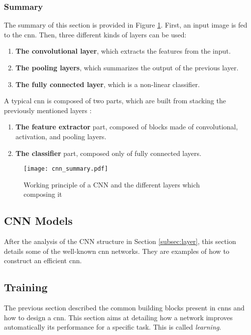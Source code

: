 \subsubsection{Summary}
%
The summary of this section is provided in Figure \ref{fig:layer:summary}. First, an input image is fed to the \acrshort{cnn}. Then, three different kinds of layers can be used:
%
\begin{enumerate}
    \item \textbf{The convolutional layer}, which extracts the features from the input.
    \item \textbf{The pooling layers}, which summarizes the output of the previous layer.
    \item \textbf{The fully connected layer}, which is a non-linear classifier.
\end{enumerate}
%
A typical \acrshort{cnn} is composed of two parts, which are built from stacking the previously mentioned layers \cite{matteucci_artificial_2019}:
\begin{enumerate}
    \item \textbf{The feature extractor} part, composed of blocks made of convolutional, activation, and pooling layers.
    \item \textbf{The classifier} part, composed only of fully connected layers.
\end{enumerate}
%
\begin{figure}[H]
    \centering
    \texttt{[image: cnn\_summary.pdf]}
    \caption{Working principle of a CNN and the different layers which composing it}
    \label{fig:layer:summary}
\end{figure}
%
\subsection{CNN Models} \label{subsec:models}
After the analysis of the CNN structure in Section \ref{subsec:layer}, this section details some of the well-known \acrshort{cnn} networks. They are examples of how to construct an efficient \acrshort{cnn}.

%

%
%
\subsection{Training} \label{subsec:train}
The previous section described the common building blocks present in \acrshort{cnn}s and how to design a \acrshort{cnn}. This section aims at detailing how a network improves automatically its performance for a specific task. This is called \textit{learning}.

